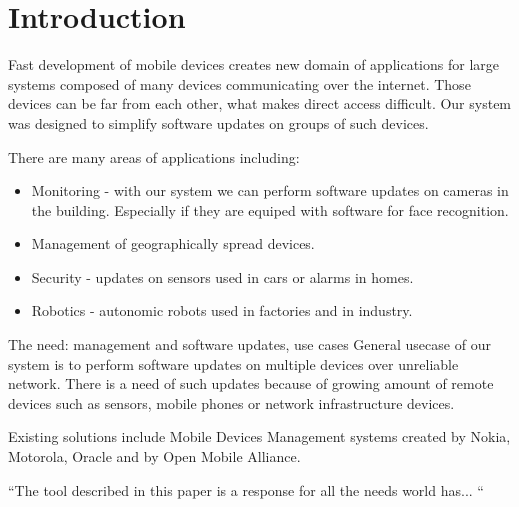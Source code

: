 \section{Introduction}

	Fast development of mobile devices creates new domain of applications for large systems composed of many devices communicating over the internet. Those devices can be far from each other, what makes direct access difficult. Our system was designed to simplify software updates on groups of such devices.

	There are many areas of applications including:
    \begin{itemize}
    \item Monitoring - with our system we can perform software updates on cameras in the building. Especially if they are equiped with software for face recognition.
    \item Management of geographically spread devices.
    \item Security - updates on sensors used in cars or alarms in homes.
    \item Robotics - autonomic robots used in factories and in industry.
    \end{itemize}
	 The need: management and software updates, use cases
    General usecase of our system is to perform software updates on multiple devices over unreliable network. There is a need of such updates because of growing amount of remote devices such as sensors, mobile phones or network infrastructure devices. 

 Existing solutions include Mobile Devices Management systems created by Nokia, Motorola, Oracle and by Open Mobile Alliance. %

 ``The tool described in this paper is a response for all the needs world has... ``


